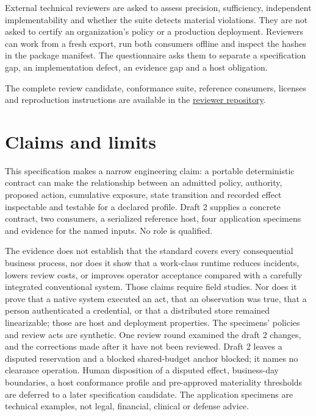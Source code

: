\documentclass[
  american,
  11pt,
  letterpaper,
]{article}
\begin{document}
External technical reviewers are asked to assess precision, sufficiency,
independent implementability and whether the suite detects material
violations. They are not asked to certify an organization's policy or a
production deployment. Reviewers can work from a fresh export, run both
consumers offline and inspect the hashes in the package manifest. The
questionnaire asks them to separate a specification gap, an
implementation defect, an evidence gap and a host obligation.

The complete review candidate, conformance suite, reference consumers,
licenses and reproduction instructions are available in the
\href{https://github.com/seampoint/work-class-review}{reviewer
repository}.

\section{Claims and limits}\label{claims-and-limits}

This specification makes a narrow engineering claim: a portable
deterministic contract can make the relationship between an admitted
policy, authority, proposed action, cumulative exposure, state
transition and recorded effect inspectable and testable for a declared
profile. Draft 2 supplies a concrete contract, two consumers, a
serialized reference host, four application specimens and evidence for
the named inputs. No role is qualified.

The evidence does not establish that the standard covers every
consequential business process, nor does it show that a work-class
runtime reduces incidents, lowers review costs, or improves operator
acceptance compared with a carefully integrated conventional system.
Those claims require field studies. Nor does it prove that a native
system executed an act, that an observation was true, that a person
authenticated a credential, or that a distributed store remained
linearizable; those are host and deployment properties. The specimens'
policies and review acts are synthetic. One review round examined the
draft 2 changes, and the corrections made after it have not been
reviewed. Draft 2 leaves a disputed reservation and a blocked
shared-budget anchor blocked; it names no clearance operation. Human
disposition of a disputed effect, business-day boundaries, a host
conformance profile and pre-approved materiality thresholds are deferred
to a later specification candidate. The application specimens are
technical examples, not legal, financial, clinical or defense advice.
\end{document}
